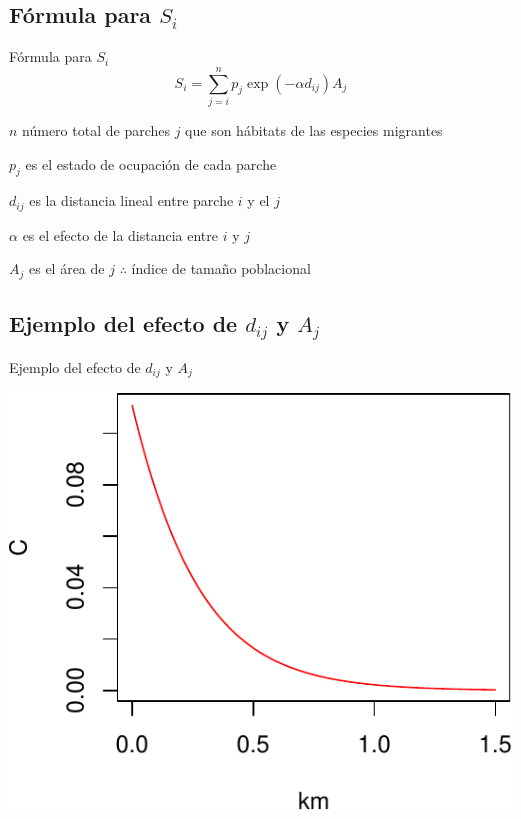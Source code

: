 \documentclass[
  11pt,
  ignorenonframetext,
]{beamer}
\begin{document}
\hypertarget{fuxf3rmula-para-s_i}{%
\subsection{\texorpdfstring{Fórmula para
\(S_i\)}{Fórmula para S\_i}}\label{fuxf3rmula-para-s_i}}

\begin{frame}{Fórmula para \(S_i\)}
\[S_i = \sum_{j = i}^{n} p_j \exp(- \alpha d_{ij}) A_j\]

\(n\) número total de parches \(j\) que son hábitats de las especies
migrantes

\(p_j\) es el estado de ocupación de cada parche

\(d_{ij}\) es la distancia lineal entre parche \(i\) y el \(j\)

\(\alpha\) es el efecto de la distancia entre \(i\) y \(j\)

\(A_j\) es el área de \(j\) \(\therefore\) índice de tamaño poblacional
\end{frame}

\hypertarget{ejemplo-del-efecto-de-d_ij-y-a_j}{%
\subsection{\texorpdfstring{Ejemplo del efecto de \(d_{ij}\) y
\(A_j\)}{Ejemplo del efecto de d\_\{ij\} y A\_j}}\label{ejemplo-del-efecto-de-d_ij-y-a_j}}

\begin{frame}{Ejemplo del efecto de \(d_{ij}\) y \(A_j\)}
\begin{center}\includegraphics{Hanski_files/figure-beamer/unnamed-chunk-5-1} \end{center}
\end{frame}
\end{document}

